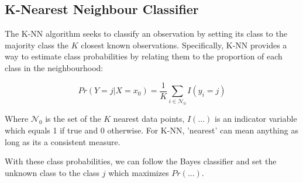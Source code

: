 \subsection{K-Nearest Neighbour Classifier}

The K-NN algorithm seeks to classify an observation by setting its class to the majority class the $K$ closest known observations. Specifically, K-NN provides a way to estimate class probabilities by relating them to the proportion of each class in the neighbourhood:

$$ Pr(Y=j|X=x_{0}) = \frac{1}{K} \sum_{i\in \mathcal{N}_{0}} I(y_{i} = j) $$

Where $\mathcal{N}_{0}$ is the set of the $K$ nearest data points, $I(...)$ is an indicator variable which equals 1 if true and 0 otherwise. For K-NN, 'nearest' can mean anything as long as its a consistent measure.

With these class probabilities, we can follow the Bayes classifier and set the unknown class to the class $j$ which maximizes $Pr(...)$.

